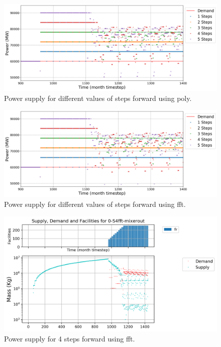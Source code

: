 \documentclass[11pt]{article}
\begin{document}
\begin{figure}[H]
	\centering
	\includegraphics[width=\textwidth]{23-figures/23-power-buffer0-poly-steps.png} 
	\hfill
	\caption{Power supply for different values of steps forward using poly.}
	\label{fig:23-ste-poly}
\end{figure}

\begin{figure}[H]
	\centering
	\includegraphics[width=\textwidth]{23-figures/23-power-buffer0-fft-steps.png} 
	\hfill
	\caption{Power supply for different values of steps forward using fft.}
	\label{fig:23-ste-fft}
\end{figure}

\begin{figure}[H]
	\centering
	\includegraphics[width=\textwidth]{23-figures/0-S4-fft-mixerout.png} 
	\hfill
	\caption{Power supply for 4 steps forward using fft.}
	\label{fig:23-ste-fft-mixerout}
\end{figure}
\end{document}
